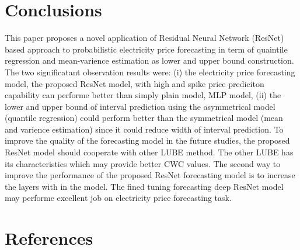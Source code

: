 \documentclass[review]{elsarticle}
\begin{document}
  \section{Conclusions}
    This paper proposes a novel application of Residual Neural Network (ResNet) based approach to probabilistic electricity price forecasting in term of quaintile regression and mean-varience estimation as lower and upper bound construction.
    The two significatant observation results were:
    (i) the electricity price forecasting model, the proposed ResNet model, with high and spike price prediciton capability can performe better than simply plain model, MLP model,
    (ii) the lower and upper bound of interval prediction using the asymmetrical model (quantile regression) could perform better than the symmetrical model (mean and varience estimation) since it could reduce width of interval prediction.
    To improve the quality of the forecasting model in the future studies, the proposed ResNet model should cooperate with other LUBE method.
    The other LUBE has its characteristics which may provide better CWC values.
    The second way to improve the performance of the proposed ResNet forecasting model is to increase the layers with in the model. The fined tuning forecasting deep ResNet model may performe excellent job on electricity price forecasting task.

  \section*{References}
  
\end{document}
